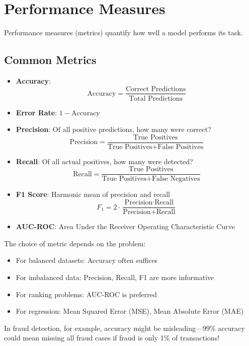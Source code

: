 \section{Performance Measures}

Performance measures (metrics) quantify how well a model performs its task.

\subsection{Common Metrics}

\begin{itemize}
    \item \textbf{Accuracy}: 
    \[
    \text{Accuracy} = \frac{\text{Correct Predictions}}{\text{Total Predictions}}
    \]
    
    \item \textbf{Error Rate}: $1 - \text{Accuracy}$
    
    \item \textbf{Precision}: Of all positive predictions, how many were correct?
    \[
    \text{Precision} = \frac{\text{True Positives}}{\text{True Positives} + \text{False Positives}}
    \]
    
    \item \textbf{Recall}: Of all actual positives, how many were detected?
    \[
    \text{Recall} = \frac{\text{True Positives}}{\text{True Positives} + \text{False Negatives}}
    \]
    
    \item \textbf{F1 Score}: Harmonic mean of precision and recall
    \[
    F_1 = 2 \cdot \frac{\text{Precision} \cdot \text{Recall}}{\text{Precision} + \text{Recall}}
    \]
    
    \item \textbf{AUC-ROC}: Area Under the Receiver Operating Characteristic Curve
\end{itemize}

\begin{bluebox}
The choice of metric depends on the problem:
\begin{itemize}
    \item For balanced datasets: Accuracy often suffices
    \item For imbalanced data: Precision, Recall, F1 are more informative
    \item For ranking problems: AUC-ROC is preferred
    \item For regression: Mean Squared Error (MSE), Mean Absolute Error (MAE)
\end{itemize}

In fraud detection, for example, accuracy might be misleading---99\% accuracy could mean missing all fraud cases if fraud is only 1\% of transactions!
\end{bluebox}

